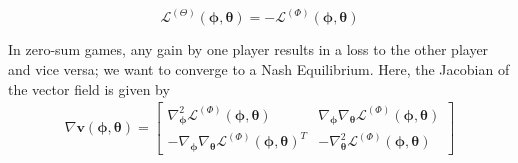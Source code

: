 \documentclass{article}
\renewcommand{\vec}[1]{\ensuremath{\boldsymbol{#1}}}
\newcommand{\phth}[0]{\ensuremath{(\boldsymbol{\phi}, \boldsymbol{\theta})}}
\begin{document}
\begin{defn}
\[
    \mathcal{L}^{(\Theta)}(\vec{\phi},\vec{\theta}) = - \mathcal{L}^{(\Phi)}(\vec{\phi},\vec{\theta})
\]
\end{defn}
In zero-sum games, any gain by one player results in a loss to the other player and vice versa; we want to converge to a Nash Equilibrium. Here, the Jacobian of the vector field is given by
\begin{align}
    \nabla\vec{v}\phth= 
    \begin{bmatrix} 
        \nabla^2_{\vec{\phi}} \mathcal{L}^{(\Phi)}(\vec{\phi}, \vec{\theta}) & \nabla_{\vec{\phi}}\nabla_{\vec{\theta}} \mathcal{L}^{(\Phi)}(\vec{\phi}, \vec{\theta}) \\
        - \nabla_{\vec{\phi}}\nabla_{\vec{\theta}} \mathcal{L}^{(\Phi)}(\vec{\phi}, \vec{\theta})^T & - \nabla^2_{\vec{\theta}} \mathcal{L}^{(\Phi)}(\vec{\phi}, \vec{\theta}) 
    \end{bmatrix}
\end{align} 
\end{document}
